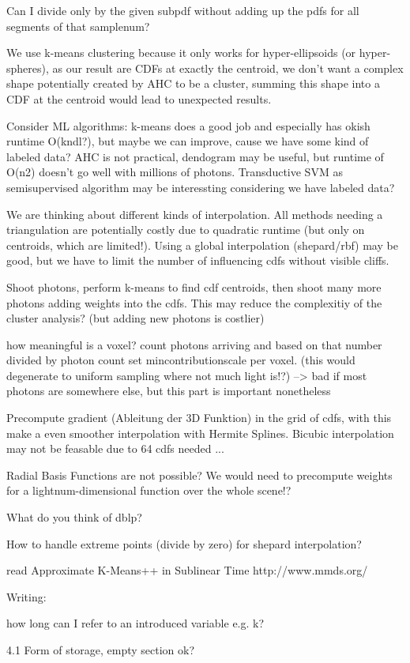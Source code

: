 Can I divide only by the given subpdf without adding up the pdfs for all segments of that samplenum?

We use k-means clustering because it only works for hyper-ellipsoids (or hyper-spheres), as our result are CDFs at exactly the centroid, we don't want a complex shape potentially created by AHC to be a cluster, summing this shape into a CDF at the centroid would lead to unexpected results.

Consider ML algorithms: k-means does a good job and especially has okish runtime O(kndl?), but maybe we can improve, cause we have some kind of labeled data? AHC is not practical, dendogram may be useful, but runtime of O(n2) doesn't go well with millions of photons. Transductive SVM as semisupervised algorithm may be interessting considering we have labeled data? 

We are thinking about different kinds of interpolation. All methods needing a triangulation are potentially costly due to quadratic runtime (but only on centroids, which are limited!). Using a global interpolation (shepard/rbf) may be good, but we have to limit the number of influencing cdfs without visible cliffs.

Shoot photons, perform k-means to find cdf centroids, then shoot many more photons adding weights into the cdfs. This may reduce the complexitiy of the cluster analysis? (but adding new photons is costlier)

how meaningful is a voxel? count photons arriving and based on that number divided by photon count set mincontributionscale per voxel. (this would degenerate to uniform sampling where not much light is!?) --> bad if most photons are somewhere else, but this part is important nonetheless

Precompute gradient (Ableitung der 3D Funktion) in the grid of cdfs, with this make a even smoother interpolation with Hermite Splines. Bicubic interpolation may not be feasable due to 64 cdfs needed ...

Radial Basis Functions are not possible? We would need to precompute weights for a lightnum-dimensional function over the whole scene!?

What do you think of dblp?

How to handle extreme points (divide by zero) for shepard interpolation?

read
Approximate K-Means++ in Sublinear Time
http://www.mmds.org/



Writing:

how long can I refer to an introduced variable e.g. k?

4.1 Form of storage, empty section ok?
